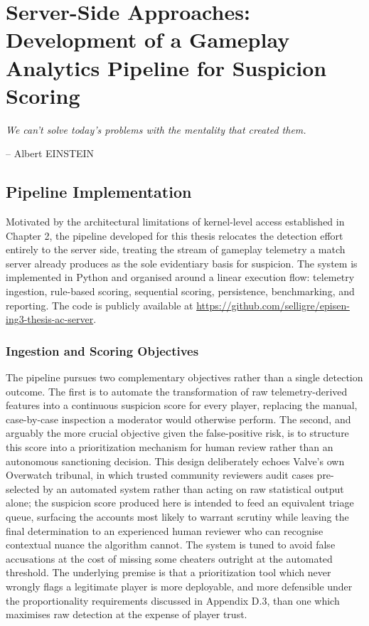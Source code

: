 \chapter{Server-Side Approaches: Development of a Gameplay
Analytics Pipeline for Suspicion Scoring}
\label{chap:three}

\epigraph{\itshape We can't solve today's problems with the mentality that created them.}{-- Albert EINSTEIN}

\stopcontents[chapters]
\startcontents[chapters]

\printMyMinitoc

\fancyhead[LE]{\textsc{\chaptername~\thechapter}}

\section{Pipeline Implementation}
\label{sec:three:one}

Motivated by the architectural limitations of kernel-level access established in Chapter 2, the pipeline developed for this thesis relocates the detection effort entirely to the server side, treating the stream of gameplay telemetry a match server already produces as the sole evidentiary basis for suspicion. The system is implemented in Python and organised around a linear execution flow: telemetry ingestion, rule-based scoring, sequential scoring, persistence, benchmarking, and reporting. The code is publicly available at \url{https://github.com/selligre/episen-ing3-thesis-ac-server}.

\subsection{Ingestion and Scoring Objectives}
\label{sec:three:one:one}

The pipeline pursues two complementary objectives rather than a single detection outcome. The first is to automate the transformation of raw telemetry-derived features into a continuous suspicion score for every player, replacing the manual, case-by-case inspection a moderator would otherwise perform. The second, and arguably the more crucial objective given the false-positive risk, is to structure this score into a prioritization mechanism for human review rather than an autonomous sanctioning decision. This design deliberately echoes Valve's own Overwatch tribunal, in which trusted community reviewers audit cases pre-selected by an automated system rather than acting on raw statistical output alone; the suspicion score produced here is intended to feed an equivalent triage queue, surfacing the accounts most likely to warrant scrutiny while leaving the final determination to an experienced human reviewer who can recognise contextual nuance the algorithm cannot. The system is tuned to avoid false accusations at the cost of missing some cheaters outright at the automated threshold. The underlying premise is that a prioritization tool which never wrongly flags a legitimate player is more deployable, and more defensible under the proportionality requirements discussed in Appendix D.3, than one which maximises raw detection at the expense of player trust.

